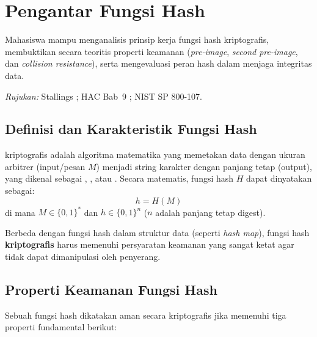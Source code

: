\section{Pengantar Fungsi Hash}

\begin{subcpmk}
  \item Mahasiswa mampu menganalisis prinsip kerja fungsi hash kriptografis, membuktikan secara teoritis properti keamanan (\textit{pre-image}, \textit{second pre-image}, dan \textit{collision resistance}), serta mengevaluasi peran hash dalam menjaga integritas data.
\end{subcpmk}

\noindent\textit{Rujukan:} Stallings \cite{stallings2017}; HAC Bab~9 \cite{hac_online}; NIST SP 800-107.

\subsection{Definisi dan Karakteristik Fungsi Hash}

 kriptografis adalah algoritma matematika yang memetakan data dengan ukuran arbitrer (input/pesan $M$) menjadi string karakter dengan panjang tetap (output), yang dikenal sebagai , , atau . Secara matematis, fungsi hash $H$ dapat dinyatakan sebagai:
\begin{equation}
  h = H(M)
\end{equation}
di mana $M \in \{0, 1\}^*$ dan $h \in \{0, 1\}^n$ ($n$ adalah panjang tetap digest).

Berbeda dengan fungsi hash dalam struktur data (seperti \textit{hash map}), fungsi hash \textbf{kriptografis} harus memenuhi persyaratan keamanan yang sangat ketat agar tidak dapat dimanipulasi oleh penyerang.

\subsection{Properti Keamanan Fungsi Hash}

Sebuah fungsi hash dikatakan aman secara kriptografis jika memenuhi tiga properti fundamental berikut:

